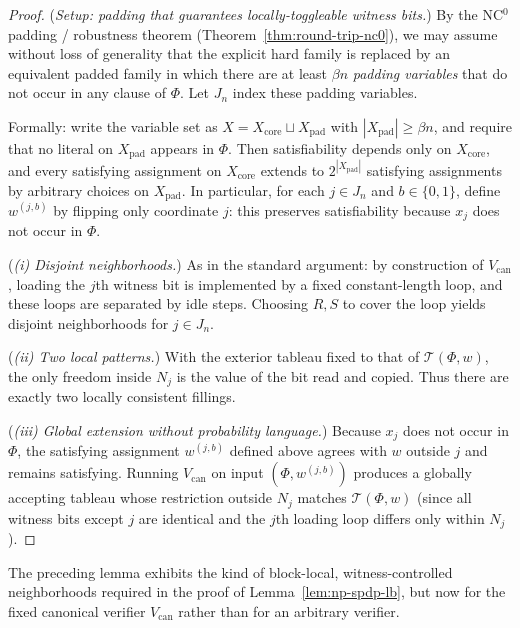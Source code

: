 \documentclass[12pt]{article}
\theoremstyle{definition}
\theoremstyle{definition}
\theoremstyle{remark}
\theoremstyle{remark}
\begin{document}
\begin{proof}
(\emph{Setup: padding that guarantees locally-toggleable witness bits.})
By the NC$^0$ padding / robustness theorem (Theorem~\ref{thm:round-trip-nc0}), we may assume
without loss of generality that the explicit hard family is replaced by an equivalent padded family
in which there are at least $\beta n$ \emph{padding variables} that do not occur in any clause of $\Phi$.
Let $J_n$ index these padding variables.

Formally: write the variable set as $X = X_{\mathrm{core}}\sqcup X_{\mathrm{pad}}$ with
$|X_{\mathrm{pad}}|\ge \beta n$, and require that no literal on $X_{\mathrm{pad}}$ appears in $\Phi$.
Then satisfiability depends only on $X_{\mathrm{core}}$, and every satisfying assignment on $X_{\mathrm{core}}$
extends to $2^{|X_{\mathrm{pad}}|}$ satisfying assignments by arbitrary choices on $X_{\mathrm{pad}}$.
In particular, for each $j\in J_n$ and $b\in\{0,1\}$, define $w^{(j,b)}$ by flipping only coordinate $j$:
this preserves satisfiability because $x_j$ does not occur in $\Phi$.

(\emph{(i) Disjoint neighborhoods.})
As in the standard argument: by construction of $V_{\mathrm{can}}$, loading the $j$th witness bit is
implemented by a fixed constant-length loop, and these loops are separated by idle steps.
Choosing $R,S$ to cover the loop yields disjoint neighborhoods for $j\in J_n$.

(\emph{(ii) Two local patterns.})
With the exterior tableau fixed to that of $\mathcal{T}(\Phi,w)$, the only freedom inside $N_j$ is the value
of the bit read and copied. Thus there are exactly two locally consistent fillings.

(\emph{(iii) Global extension without probability language.})
Because $x_j$ does not occur in $\Phi$, the satisfying assignment $w^{(j,b)}$ defined above agrees
with $w$ outside $j$ and remains satisfying. Running $V_{\mathrm{can}}$ on input $(\Phi,w^{(j,b)})$
produces a globally accepting tableau whose restriction outside $N_j$ matches $\mathcal{T}(\Phi,w)$
(since all witness bits except $j$ are identical and the $j$th loading loop differs only within $N_j$).
\end{proof}

The preceding lemma exhibits the kind of block-local, witness-controlled
neighborhoods required in the proof of Lemma~\ref{lem:np-spdp-lb}, but now
for the fixed canonical verifier $V_{\mathrm{can}}$ rather than for an
arbitrary verifier.
\end{document}
